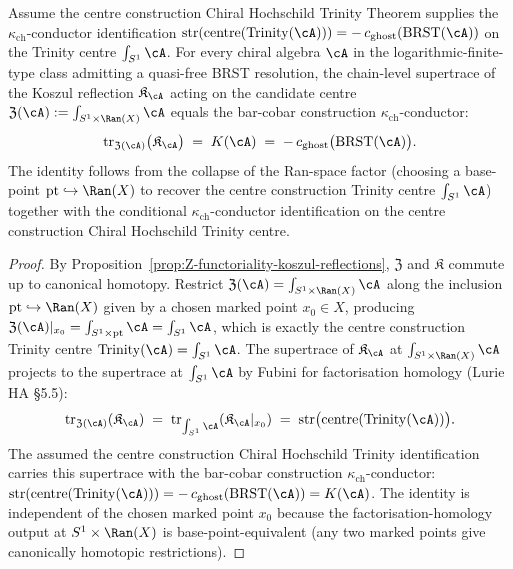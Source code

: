 \begin{proposition}
\label{prop:supertrace-trinity-centre-collapse}
Assume the centre construction Chiral Hochschild Trinity Theorem supplies the
$\kappa_{\mathrm{ch}}$-conductor identification
$\mathrm{str}(\mathrm{centre}(\mathrm{Trinity}(\cA))) = -\,c_{\mathrm{ghost}}(\mathrm{BRST}(\cA))$
on the Trinity centre $\int_{S^1} \cA$.
For every chiral algebra $\cA$ in the logarithmic-finite-type class
admitting a quasi-free BRST resolution, the chain-level supertrace of
the Koszul reflection $\mathfrak{K}_\cA$ acting on the candidate centre
$\mathfrak{Z}(\cA) := \int_{S^1 \times \Ran(X)} \cA$ equals the bar-cobar construction
$\kappa_{\mathrm{ch}}$-conductor:
\[
 \mathrm{tr}_{\mathfrak{Z}(\cA)}\bigl(\mathfrak{K}_\cA\bigr) \;=\; K(\cA) \;=\; -\,c_{\mathrm{ghost}}\bigl(\mathrm{BRST}(\cA)\bigr).
\]
The identity follows from the collapse of the Ran-space factor
\textup{(}choosing a base-point $\mathrm{pt} \hookrightarrow \Ran(X)$
to recover the centre construction Trinity centre $\int_{S^1} \cA$\textup{)} together
with the conditional $\kappa_{\mathrm{ch}}$-conductor identification on
the centre construction Chiral Hochschild Trinity centre.
\end{proposition}

\begin{proof}
By Proposition~\ref{prop:Z-functoriality-koszul-reflections},
$\mathfrak{Z}$ and $\mathfrak{K}$ commute up to canonical homotopy.
Restrict $\mathfrak{Z}(\cA) = \int_{S^1 \times \Ran(X)} \cA$ along the
inclusion $\mathrm{pt} \hookrightarrow \Ran(X)$ given by a chosen marked
point $x_0 \in X$, producing
$\mathfrak{Z}(\cA)|_{x_0} = \int_{S^1 \times \mathrm{pt}} \cA = \int_{S^1} \cA$,
which is exactly the centre construction Trinity centre
$\mathrm{Trinity}(\cA) = \int_{S^1} \cA$. The supertrace of
$\mathfrak{K}_\cA$ at $\int_{S^1 \times \Ran(X)} \cA$ projects to the
supertrace at $\int_{S^1} \cA$ by Fubini for factorisation homology
\textup{(}Lurie HA \S 5.5\textup{):}
\[
 \mathrm{tr}_{\mathfrak{Z}(\cA)}(\mathfrak{K}_\cA)
 \;=\; \mathrm{tr}_{\int_{S^1} \cA}(\mathfrak{K}_\cA|_{x_0})
 \;=\; \mathrm{str}\bigl(\mathrm{centre}(\mathrm{Trinity}(\cA))\bigr).
\]
The assumed the centre construction Chiral Hochschild Trinity identification carries this
supertrace with the bar-cobar construction $\kappa_{\mathrm{ch}}$-conductor:
$\mathrm{str}(\mathrm{centre}(\mathrm{Trinity}(\cA))) = -\,c_{\mathrm{ghost}}(\mathrm{BRST}(\cA)) = K(\cA)$.
The identity is independent of the chosen marked point $x_0$ because the
factorisation-homology output at $S^1 \times \Ran(X)$ is base-point-equivalent
\textup{(}any two marked points give canonically homotopic restrictions\textup{).}
\end{proof}

